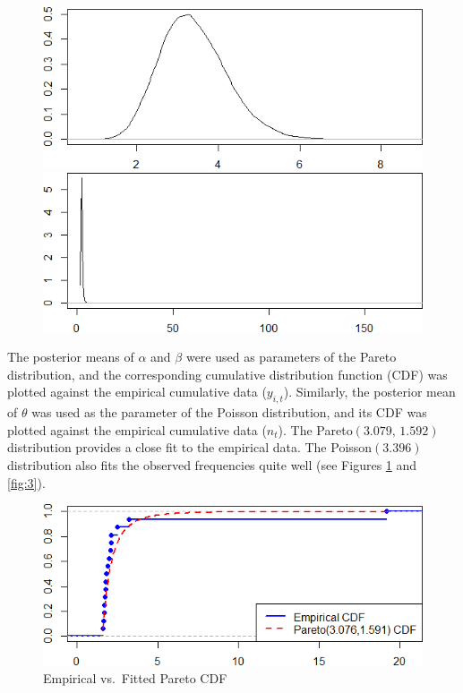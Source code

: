 \documentclass{Class/julia}
\begin{document}
\begin{figure}[!ht]
    \begin{minipage}{0.45\textwidth}
        \centering
        \includegraphics[width=\textwidth]{rytgaard1990/density_theta.png}
        \subcaption{\( \theta \)}
    \end{minipage}%
    \hfill
    \begin{minipage}{0.45\textwidth}
        \centering
        \includegraphics[width=\textwidth]{rytgaard1990/density_E_y.png}
    \end{minipage}
    
\end{figure}

The posterior means of \( \alpha \) and \( \beta \) were used as parameters of the Pareto distribution, and the corresponding cumulative distribution function (CDF) was plotted against the empirical cumulative data (\( y_{i,t} \)). Similarly, the posterior mean of \( \theta \) was used as the parameter of the Poisson distribution, and its CDF was plotted against the empirical cumulative data (\( n_t \)). The Pareto\((3.079,\,1.592)\) distribution provides a close fit to the empirical data. The Poisson\((3.396)\) distribution also fits the observed frequencies quite well (see Figures \ref{fig:2} and \ref{fig:3}).

\begin{figure}[!ht]
    \centering
    \caption{Empirical vs.\ Fitted Pareto CDF}
    \label{fig:2}
    \includegraphics[width=.75\textwidth]{rytgaard1990/empirical_vs_pareto.png}
\end{figure}
\end{document}
